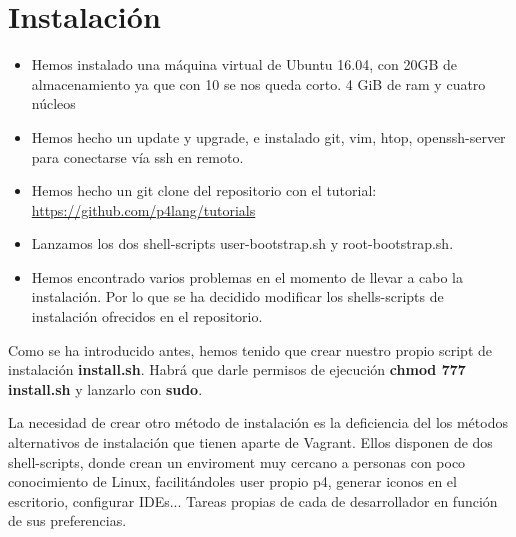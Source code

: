 {}

\newpage
\section{Instalación}
\begin{itemize}
    \item Hemos instalado una máquina virtual de Ubuntu 16.04, con 20GB de almacenamiento ya que con 10 se nos queda corto. 4 GiB de ram y cuatro núcleos
    
    \item Hemos hecho un update y upgrade, e instalado git, vim, htop, openssh-server para conectarse vía ssh en remoto.
    
    \item Hemos hecho un git clone del repositorio con el tutorial:
    \url{https://github.com/p4lang/tutorials}
    
    \item Lanzamos los dos shell-scripts user-bootstrap.sh y root-bootstrap.sh. 
    \item Hemos encontrado varios problemas en el momento de llevar a cabo la instalación. Por lo que se ha decidido modificar los shells-scripts de instalación ofrecidos en el repositorio.
\end{itemize}

Como se ha introducido antes, hemos tenido que crear nuestro propio script de instalación \textbf{install.sh}. Habrá que darle permisos de ejecución \textbf{chmod 777 install.sh} y lanzarlo con \textbf{sudo}. \newline
\newline

La necesidad de crear otro método de instalación es la deficiencia del los métodos alternativos de instalación que tienen aparte de Vagrant. Ellos disponen de dos shell-scripts, donde crean un enviroment muy cercano a personas con poco conocimiento de Linux, facilitándoles user propio p4, generar iconos en el escritorio, configurar IDEs... Tareas propias de cada de desarrollador en función de sus preferencias. \newline
\newline

